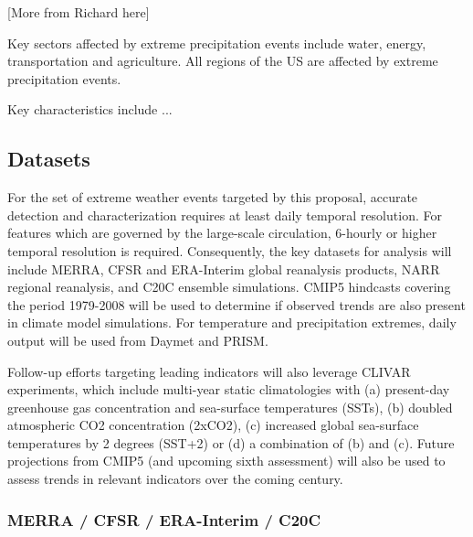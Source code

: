 \documentclass[11pt]{article}
\begin{document}
{\color{red}[More from Richard here]}

Key sectors affected by extreme precipitation events include water, energy, transportation and agriculture.  All regions of the US are affected by extreme precipitation events.

Key characteristics include ...


\subsection{Datasets} \label{sec:Datasets}

For the set of extreme weather events targeted by this proposal, accurate detection and characterization requires at least daily temporal resolution.  For features which are governed by the large-scale circulation, 6-hourly or higher temporal resolution is required.  Consequently, the key datasets for analysis will include MERRA, CFSR and ERA-Interim global reanalysis products, NARR regional reanalysis, and C20C ensemble simulations.  CMIP5 hindcasts covering the period 1979-2008 will be used to determine if observed trends are also present in climate model simulations.  For temperature and precipitation extremes, daily output will be used from Daymet and PRISM.

Follow-up efforts targeting leading indicators will also leverage CLIVAR experiments, which include multi-year static climatologies with (a) present-day greenhouse gas concentration and sea-surface temperatures (SSTs), (b) doubled atmospheric CO2 concentration (2xCO2), (c) increased global sea-surface temperatures by 2 degrees (SST+2) or (d) a combination of (b) and (c).  Future projections from CMIP5 (and upcoming sixth assessment) will also be used to assess trends in relevant indicators over the coming century.

\subsubsection*{MERRA / CFSR / ERA-Interim / C20C} \label{sec:MERRA}
\end{document}
